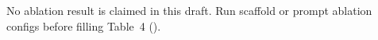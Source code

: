 No ablation result is claimed in this draft. Run scaffold or prompt ablation configs before filling Table~4 ().

